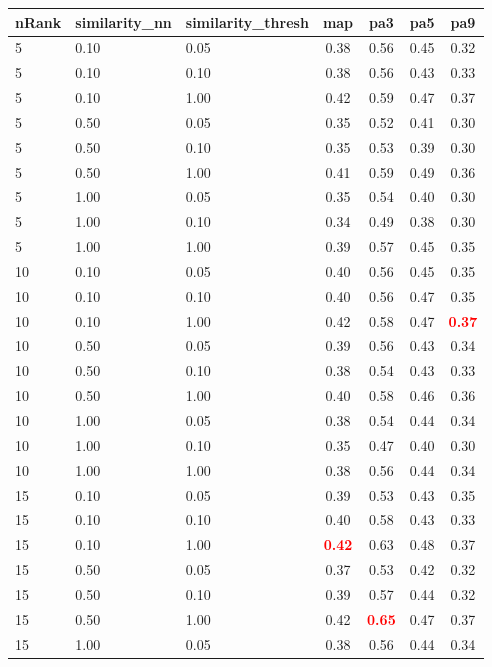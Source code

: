   
\begin{table} 
\begin{center} 
\scriptsize 
 \setlength{\tabcolsep}{.16667em} 
\begin{tabular}{lllcccc} 
nRank & similarity\_nn & similarity\_thresh & map & pa3 & pa5 & pa9 \\ 
\hline 
 5 & 0.10 & 0.05 & 0.38 & 0.56 & 0.45 & 0.32 \\ 
 5 & 0.10 & 0.10 & 0.38 & 0.56 & 0.43 & 0.33 \\ 
 5 & 0.10 & 1.00 & 0.42 & 0.59 & 0.47 & 0.37 \\ 
 5 & 0.50 & 0.05 & 0.35 & 0.52 & 0.41 & 0.30 \\ 
 5 & 0.50 & 0.10 & 0.35 & 0.53 & 0.39 & 0.30 \\ 
 5 & 0.50 & 1.00 & 0.41 & 0.59 & 0.49 & 0.36 \\ 
 5 & 1.00 & 0.05 & 0.35 & 0.54 & 0.40 & 0.30 \\ 
 5 & 1.00 & 0.10 & 0.34 & 0.49 & 0.38 & 0.30 \\ 
 5 & 1.00 & 1.00 & 0.39 & 0.57 & 0.45 & 0.35 \\ 
10 & 0.10 & 0.05 & 0.40 & 0.56 & 0.45 & 0.35 \\ 
10 & 0.10 & 0.10 & 0.40 & 0.56 & 0.47 & 0.35 \\ 
10 & 0.10 & 1.00 & 0.42 & 0.58 & 0.47 & \textbf{\textcolor{red}{0.37}} \\ 
10 & 0.50 & 0.05 & 0.39 & 0.56 & 0.43 & 0.34 \\ 
10 & 0.50 & 0.10 & 0.38 & 0.54 & 0.43 & 0.33 \\ 
10 & 0.50 & 1.00 & 0.40 & 0.58 & 0.46 & 0.36 \\ 
10 & 1.00 & 0.05 & 0.38 & 0.54 & 0.44 & 0.34 \\ 
10 & 1.00 & 0.10 & 0.35 & 0.47 & 0.40 & 0.30 \\ 
10 & 1.00 & 1.00 & 0.38 & 0.56 & 0.44 & 0.34 \\ 
15 & 0.10 & 0.05 & 0.39 & 0.53 & 0.43 & 0.35 \\ 
15 & 0.10 & 0.10 & 0.40 & 0.58 & 0.43 & 0.33 \\ 
15 & 0.10 & 1.00 & \textbf{\textcolor{red}{0.42}} & 0.63 & 0.48 & 0.37 \\ 
15 & 0.50 & 0.05 & 0.37 & 0.53 & 0.42 & 0.32 \\ 
15 & 0.50 & 0.10 & 0.39 & 0.57 & 0.44 & 0.32 \\ 
15 & 0.50 & 1.00 & 0.42 & \textbf{\textcolor{red}{0.65}} & 0.47 & 0.37 \\ 
15 & 1.00 & 0.05 & 0.38 & 0.56 & 0.44 & 0.34 \\ 

\end{tabular}
\end{center}
\end{table}
